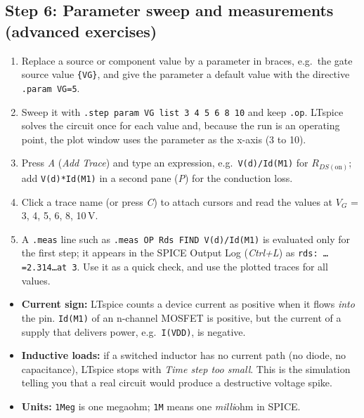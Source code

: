 \subsection{Step 6: Parameter sweep and measurements (advanced exercises)}
\begin{enumerate}[itemsep=2pt]
  \item Replace a source or component value by a parameter in braces, e.g.\ the gate source value \texttt{\{VG\}}, and give the parameter a default value with the directive \texttt{.param VG=5}.
  \item Sweep it with \texttt{.step param VG list 3 4 5 6 8 10} and keep \texttt{.op}. LTspice solves the circuit once for each value and, because the run is an operating point, the plot window uses the parameter as the x-axis (3 to 10).
  \item Press \textit{A} (\textit{Add Trace}) and type an expression, e.g.\ \texttt{V(d)/Id(M1)} for $R_{DS(\mathrm{on})}$; add \texttt{V(d)*Id(M1)} in a second pane (\textit{P}) for the conduction loss.
  \item Click a trace name (or press \textit{C}) to attach cursors and read the values at $V_G$ = 3, 4, 5, 6, 8, 10\,V.
  \item A \texttt{.meas} line such as \texttt{.meas OP Rds FIND V(d)/Id(M1)} is evaluated only for the first step; it appears in the SPICE Output Log (\textit{Ctrl+L}) as \texttt{rds: \ldots=2.314\ldots at 3}. Use it as a quick check, and use the plotted traces for all values.
\end{enumerate}

\begin{tipbox}
\begin{itemize}[leftmargin=*,itemsep=1pt]
  \item \textbf{Current sign:} LTspice counts a device current as positive when it flows \emph{into} the pin. \texttt{Id(M1)} of an
        n-channel MOSFET is positive, but the current of a supply that delivers power, e.g.\ \texttt{I(VDD)}, is negative.
  \item \textbf{Inductive loads:} if a switched inductor has no current path (no diode, no capacitance), LTspice stops with
        \textit{Time step too small}. This is the simulation telling you that a real circuit would produce a destructive voltage spike.
  \item \textbf{Units:} \texttt{1Meg} is one megaohm; \texttt{1M} means one \emph{milli}ohm in SPICE.
\end{itemize}
\end{tipbox}
